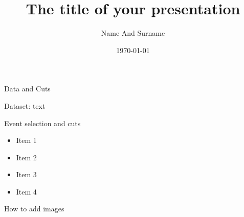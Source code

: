 


	\title{The title of your presentation}
	\author{Name And Surname}
	\date{\today} 


	\begin{frame}{Data and Cuts}

		\begin{block}{Dataset:}
			text
		\end{block}

		\begin{block}{Event selection and cuts}
			\begin{itemize}
			\item Item 1
			\item Item 2
			\item Item 3
			\item Item 4
			\end{itemize}
		\end{block}
	\end{frame}

	\begin{frame}{How to add images} 
	\end{frame}


